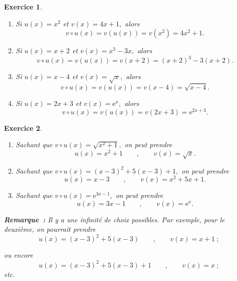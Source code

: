 \documentclass[10pt]{article}
\newtheorem{exo}{Exercice}
\begin{document}
\begin{exo}



\begin{enumerate}
\item Si $u(x)=x^2$ et $ v(x)=4x+1,$ alors
\[v\circ u(x)=v(u(x))=v\left(x^2\right)=4x^2+1.\]
\item Si $u(x)=x+2$ et $v(x)=x^3-3x,$ alors
\[v\circ u(x)=v(u(x))=v\left(x+2\right)=(x+2)^3-3(x+2).\]
\item  Si $u(x)=x-4$ et $ v(x)=\sqrt{x},$ alors
\[v\circ u(x)=v(u(x))=v\left(x-4\right)=\sqrt{x-4}.\]
\item Si $u(x)=2x+3$ et $v(x)=\text{e}^x,$ alors
\[v\circ u(x)=v(u(x))=v\left(2x+3\right)=\text{e}^{2x+3}.\]
\end{enumerate}

\end{exo}

\begin{exo}

\begin{enumerate}
\item Sachant que $v\circ u(x)=\sqrt{x^2+1},$ on peut prendre
\[u(x)=x^2+1\qquad,\qquad v(x)=\sqrt{x}.\]
\item Sachant que $v\circ u(x)=(x-3)^2+5(x-3)+1,$ on peut prendre
\[u(x)=x-3\qquad,\qquad v(x)=x^2+5x+1.\]
\item  Sachant que $v\circ u(x)=\text{e}^{3x-1},$ on peut prendre
\[u(x)=3x-1\qquad,\qquad v(x)=\text{e}^x.\]
\end{enumerate}

\medskip

\textbf{Remarque~:} Il y a une infinité de choix possibles. Par exemple, pour le deuxième, on pourrait prendre
\[u(x)=(x-3)^2+5(x-3)\qquad,\qquad v(x)=x+1~;\]

ou encore 
\[u(x)=(x-3)^2+5(x-3)+1\qquad,\qquad v(x)=x~;\]
etc.


\end{exo}
\end{document}
